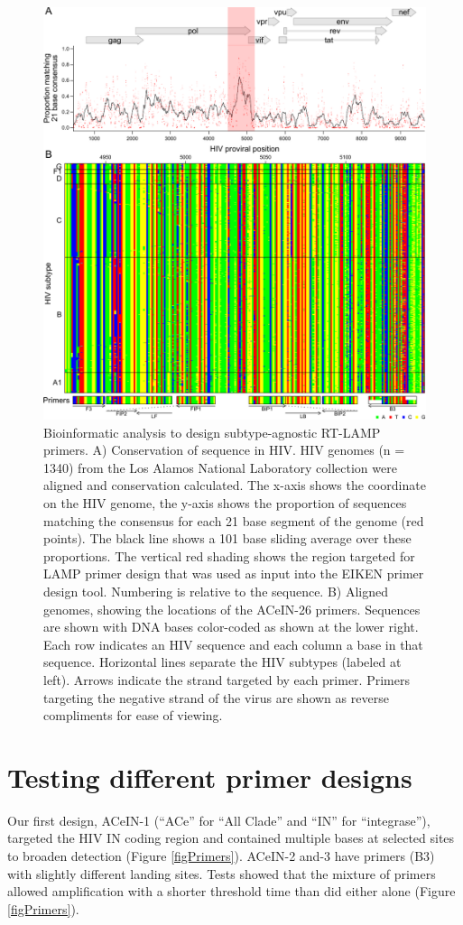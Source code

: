 \documentclass[../sherrill-Mix_thesis.tex]{subfiles}
\begin{document}
			\begin{figure}
			\centering
				\includegraphics[width=.91\textwidth]{2.pdf} %
			\caption[Subtype-agnostic RT-LAMP primers design]{Bioinformatic analysis to design subtype-agnostic RT-LAMP primers. A) Conservation of sequence in HIV. HIV genomes (n = 1340) from the Los Alamos National Laboratory collection were aligned and conservation calculated. The x-axis shows the coordinate on the HIV genome, the y-axis shows the proportion of sequences matching the consensus for each 21 base segment of the genome (red points). The black line shows a 101 base sliding average over these proportions. The vertical red shading shows the region targeted for LAMP primer design that was used as input into the EIKEN primer design tool. Numbering is relative to the \hivEight{} sequence. B) Aligned genomes, showing the locations of the ACeIN-26 primers. Sequences are shown with DNA bases color-coded as shown at the lower right. Each row indicates an HIV sequence and each column a base in that sequence. Horizontal lines separate the HIV subtypes (labeled at left). Arrows indicate the strand targeted by each primer. Primers targeting the negative strand of the virus are shown as reverse compliments for ease of viewing.}
			\label{figConsensus}
			\end{figure}

		\section{Testing different primer designs}
			Our first design, ACeIN-1 (``ACe'' for ``All Clade'' and ``IN'' for ``integrase''), targeted the HIV IN coding region and contained multiple bases at selected sites to broaden detection (Figure \ref{figPrimers}). ACeIN-2 and-3 have primers (B3) with slightly different landing sites. Tests showed that the mixture of primers allowed amplification with a shorter threshold time than did either alone (Figure \ref{figPrimers}).
\end{document}
